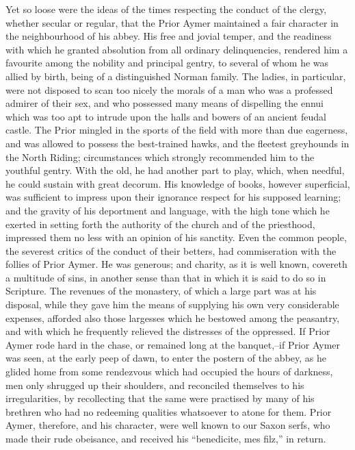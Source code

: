 Yet so loose were the ideas of the times respecting the conduct of the
clergy, whether secular or regular, that the Prior Aymer maintained a
fair character in the neighbourhood of his abbey. His free and jovial
temper, and the readiness with which he granted absolution from all
ordinary delinquencies, rendered him a favourite among the nobility and
principal gentry, to several of whom he was allied by birth, being of a
distinguished Norman family. The ladies, in particular, were not
disposed to scan too nicely the morals of a man who was a professed
admirer of their sex, and who possessed many means of dispelling the
ennui which was too apt to intrude upon the halls and bowers of an
ancient feudal castle. The Prior mingled in the sports of the field with
more than due eagerness, and was allowed to possess the best-trained
hawks, and the fleetest greyhounds in the North Riding; circumstances
which strongly recommended him to the youthful gentry. With the old, he
had another part to play, which, when needful, he could sustain with
great decorum. His knowledge of books, however superficial, was
sufficient to impress upon their ignorance respect for his supposed
learning; and the gravity of his deportment and language, with the high
tone which he exerted in setting forth the authority of the church and
of the priesthood, impressed them no less with an opinion of his
sanctity. Even the common people, the severest critics of the conduct of
their betters, had commiseration with the follies of Prior Aymer. He was
generous; and charity, as it is well known, covereth a multitude of
sins, in another sense than that in which it is said to do so in
Scripture. The revenues of the monastery, of which a large part was at
his disposal, while they gave him the means of supplying his own very
considerable expenses, afforded also those largesses which he bestowed
among the peasantry, and with which he frequently relieved the
distresses of the oppressed. If Prior Aymer rode hard in the chase, or
remained long at the banquet,--if Prior Aymer was seen, at the early
peep of dawn, to enter the postern of the abbey, as he glided home from
some rendezvous which had occupied the hours of darkness, men only
shrugged up their shoulders, and reconciled themselves to his
irregularities, by recollecting that the same were practised by many of
his brethren who had no redeeming qualities whatsoever to atone for
them. Prior Aymer, therefore, and his character, were well known to our
Saxon serfs, who made their rude obeisance, and received his
``benedicite, mes filz,'' in return.

